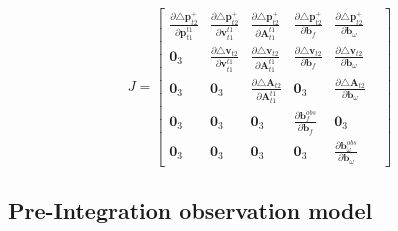 \documentclass[12pt]{article}   %
\begin{document}
\begin{equation}
J=\begin{bmatrix}
\frac{\partial { \triangle \bm{p}^+_{t2}}}{\partial \bm{p}^{t1}_{t1}}		&	
\frac{\partial { \triangle \bm{p}^+_{t2}}}{\partial \bm{v}^{t1}_{t1}}		& 
\frac{\partial { \triangle \bm{p}^+_{t2}}}{\partial \bm{A}^{t1}_{t1}}		&
\frac{\partial { \triangle \bm{p}^+_{t2}}}{\partial \bm{b}_{f}}		&
\frac{\partial { \triangle \bm{p}^+_{t2}}}{\partial \bm{b}_{\omega}}		\\
\bm{0}_3	&
\frac{\partial { \triangle \bm{v}_{t2}}}{\partial \bm{v}^{t1}_{t1}}		& 
\frac{\partial { \triangle \bm{v}_{t2}}}{\partial \bm{A}^{t1}_{t1}}		&
\frac{\partial { \triangle \bm{v}_{t2}}}{\partial \bm{b}_{f}}		&
\frac{\partial { \triangle \bm{v}_{t2}}}{\partial \bm{b}_{\omega}}		\\
\bm{0}_3	&
\bm{0}_3	&
\frac{\partial { \triangle \bm{A}_{t2}}}{\partial \bm{A}^{t1}_{t1}}		&
\bm{0}_3	&
\frac{\partial { \triangle \bm{A}_{t2}}}{\partial \bm{b}_{\omega}}		\\
\bm{0}_3	&
\bm{0}_3	&
\bm{0}_3	&
\frac{\partial { \bm{b}^{obs}_{f}}}{\partial \bm{b}_{f}}		&
\bm{0}_3	&		\\
\bm{0}_3	&
\bm{0}_3	&
\bm{0}_3	&
\bm{0}_3	&	
\frac{\partial { \bm{b}^{obs}_{\omega}}}{\partial \bm{b}_{\omega}}		&

\end{bmatrix}
\label{eq:IJB}
\end{equation}

\subsection{Pre-Integration observation model}
\end{document}
